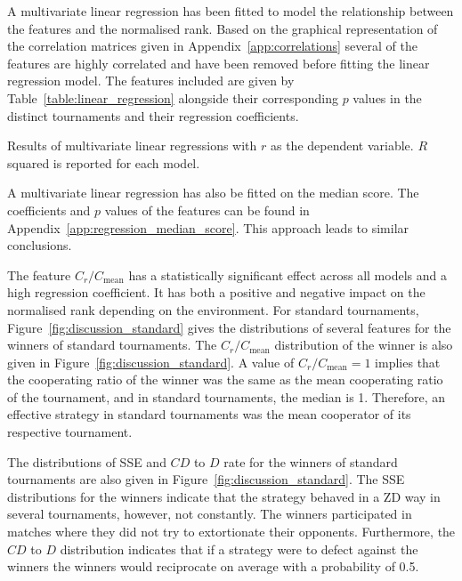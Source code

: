 \documentclass{article}
\begin{document}
A multivariate linear regression has been fitted to model the relationship between
the features and the normalised rank. Based on the graphical representation of
the correlation matrices given in Appendix~\ref{app:correlations} several of the
features are highly correlated and have been removed
before fitting the linear regression model. The features included are given
by Table~\ref{table:linear_regression} alongside their corresponding \(p\) values
in the distinct tournaments and their regression coefficients.

\begin{table}[h]
    \begin{center}
\resizebox{\textwidth}{!}{
    }
    \end{center}
    \caption{Results of multivariate linear regressions with \(r\) as the dependent variable.
    \(R\) squared is reported for each model.}
    \label{table:linear_regression}
\end{table}

A multivariate linear regression has also be fitted on the median score. The
coefficients and \(p\) values of the features can be found in
Appendix~\ref{app:regression_median_score}. This approach leads to similar conclusions.

The feature \(C_{r} / C_{\text{mean}}\) has a statistically significant effect
across all models and a high regression coefficient. It has both a positive and
negative impact on the normalised rank depending on the environment. For
standard tournaments, Figure~\ref{fig:discussion_standard} gives the
distributions of several features for the winners of standard tournaments. The
\(C_{r} / C_{\text{mean}}\) distribution of the winner is also given in
Figure~\ref{fig:discussion_standard}. A value of \(C_r / C_{\text{mean}} = 1\)
implies that the cooperating ratio of the winner was the same as the mean
cooperating ratio of the tournament, and in standard tournaments, the median is
1. Therefore, an effective strategy in standard tournaments was the mean
cooperator of its respective tournament.

The distributions of SSE and \(CD\) to \(D\) rate for the winners of standard
tournaments are also given in Figure~\ref{fig:discussion_standard}. The SSE
distributions for the winners indicate that the strategy behaved in a ZD way in
several tournaments, however, not constantly. The winners participated in
matches where they did not try to extortionate their opponents. Furthermore, the
\(CD\) to \(D\) distribution indicates that if a strategy were to defect against
the winners the winners would reciprocate on average with a probability of 0.5.
\end{document}
